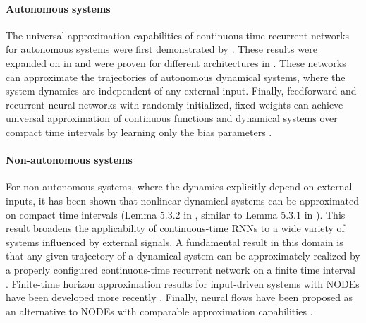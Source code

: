 \documentclass{article}
\newcounter{ct}
\begin{document}
\paragraph{Autonomous systems}
The universal approximation capabilities of continuous-time recurrent networks for autonomous systems were first demonstrated by \citet{funahashi1993approximation}. 
These results were expanded on in  \citep{kimura1998learning} and were proven for different architectures in  \citet{chow2000modeling}.
These networks can approximate the trajectories of autonomous dynamical systems, where the system dynamics are independent of any external input.
Finally, feedforward and recurrent neural networks with randomly initialized, fixed weights can achieve universal approximation of continuous functions and dynamical systems over compact time intervals by learning only the bias parameters \citep{williams2024expressivity}.

\paragraph{Non-autonomous systems}
For non-autonomous systems, where the dynamics explicitly depend on external inputs, it has been shown that nonlinear dynamical systems can be approximated on compact time intervals (Lemma 5.3.2 in  \citep{garces2012strategies}, similar to Lemma 5.3.1 in  \citet{smale1974differential}).
This result broadens the applicability of continuous-time RNNs to a wide variety of systems influenced by external signals.
A fundamental result in this domain is that any given trajectory of a dynamical system can be approximately realized by a properly configured continuous-time recurrent network on a finite time interval  \citep{nakamura2009approximation}.  %
Finite-time horizon approximation results for input-driven systems with NODEs have been developed more recently  \citep{li2022deep, ko2023homotopy, zakwan2023universal}.
Finally, neural flows have been proposed as an alternative to NODEs with comparable approximation capabilities \citep{bilos2021neural}.

	
\end{document}
